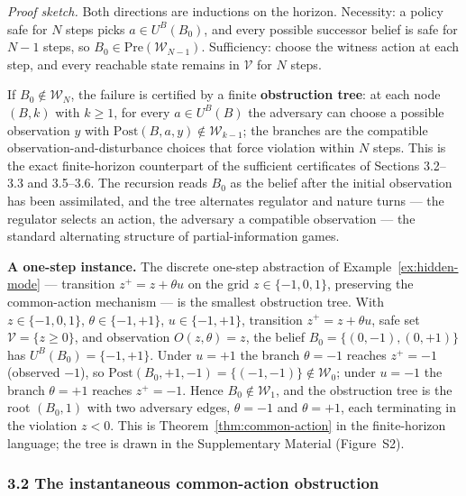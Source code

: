 \documentclass[10pt,twocolumn]{article}
\theoremstyle{definition}
\begin{document}
\emph{Proof sketch.} Both directions are inductions on the horizon. Necessity: a policy safe for \(N\) steps picks \(a \in U^B(B_0)\), and every possible successor belief is safe for \(N - 1\) steps, so \(B_0 \in \mathrm{Pre}(\mathcal{W}_{N-1})\). Sufficiency: choose the witness action at each step, and every reachable state remains in \(\mathcal{V}\) for \(N\) steps.

If \(B_0\notin\mathcal W_N\), the failure is certified by a finite
\textbf{obstruction tree}: at each node \((B,k)\) with \(k\ge1\), for
every \(a\in U^B(B)\) the adversary can choose a possible observation
\(y\) with \(\mathrm{Post}(B,a,y)\notin\mathcal W_{k-1}\); the branches
are the compatible observation-and-disturbance choices that force
violation within \(N\) steps. This is the exact finite-horizon
counterpart of the sufficient certificates of Sections 3.2--3.3 and 3.5--3.6. The recursion reads \(B_0\) as the belief after the
initial observation has been assimilated, and the tree alternates
regulator and nature turns --- the regulator selects an action, the
adversary a compatible observation --- the standard alternating
structure of partial-information games.

\textbf{A one-step instance.} The discrete one-step abstraction of
Example~\ref{ex:hidden-mode} --- transition \(z^+ = z + \theta u\) on
the grid \(z \in \{-1,0,1\}\), preserving the common-action mechanism
--- is the smallest obstruction tree. With
\(z\in\{-1,0,1\}\), \(\theta\in\{-1,+1\}\), \(u\in\{-1,+1\}\),
transition \(z^+=z+\theta u\), safe set \(\mathcal V=\{z\ge 0\}\), and
observation \(O(z,\theta)=z\), the belief \(B_0=\{(0,-1),(0,+1)\}\) has
\(U^B(B_0)=\{-1,+1\}\). Under \(u=+1\) the branch \(\theta=-1\) reaches
\(z^+=-1\) (observed \(-1\)), so
\(\mathrm{Post}(B_0,+1,-1)=\{(-1,-1)\}\notin\mathcal W_0\); under
\(u=-1\) the branch \(\theta=+1\) reaches \(z^+=-1\). Hence
\(B_0\notin\mathcal W_1\), and the obstruction tree is the root
\((B_0,1)\) with two adversary edges, \(\theta=-1\) and \(\theta=+1\),
each terminating in the violation \(z<0\). This is
Theorem~\ref{thm:common-action} in the finite-horizon language; the tree is drawn in the Supplementary Material (Figure~S2).





\subsubsection{3.2 The instantaneous common-action
obstruction}\label{the-instantaneous-common-action-obstruction}
\end{document}
